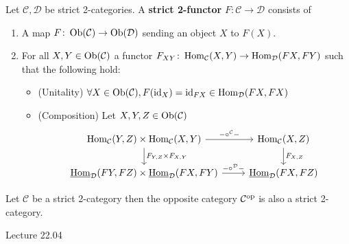 \begin{defi}
\label{strict_twofun_defi}
	Let $ \mathcal{ C } , \mathcal{ D } $  be strict 2-categories.
	A \textbf{strict 2-functor} $ F \colon \mathcal{ C } \to \mathcal{ D } $ consists of 
	\begin{enumerate}
		\item 
		A map $ F \colon \operatorname{Ob} ( \mathcal{ C } ) \to \operatorname{Ob} ( \mathcal{ D } )$  sending an object $ X $ to $ F ( X ) $.
		
		\item 
		For all $ X , Y \in \operatorname{Ob} ( \mathcal{ C } ) $ a functor $ F_{ X Y } \colon \operatorname{Hom}_{ \mathcal{ C } } ( X , Y ) \to \operatorname{Hom}_{ \mathcal{ D } } ( F X , F Y ) $ such that the following hold:
		\begin{itemize}
			\item 
			(Unitality)
			$ \forall X \in \operatorname{Ob} ( \mathcal{ C } ) , F ( \operatorname{id}_X ) = \operatorname{id}_{ F X } \in \operatorname{Hom}_{ \mathcal{ D } } ( F X, F X )$
				
			\item 
			(Composition)
			Let $ X, Y , Z \in \operatorname{Ob} ( \mathcal{ C } ) $
			\[
			\begin{tikzcd}
				\Hom_{ \mathcal{ C } } ( Y, Z ) \times \Hom_{ \mathcal{ C } }( X , Y )
				\ar[r, " - \circ^{ \mathcal{ C } } - "]
				\ar[d, " F_{ Y , Z } \times F_{ X , Y } "]
				&
				\Hom_{ \mathcal{ C } } ( X , Z )
				\ar[d, " F_{ X , Z } "]
				\\
				\twoHom_{ \mathcal{ D } } ( F Y , F Z ) \times \twoHom_{ \mathcal{ D } } ( F X , F Y )
				\ar[r, " - \circ^{ \mathcal{ D } } -"]
				&
				\twoHom_{ \mathcal{ D } }  ( F X , F Z )
			\end{tikzcd}
			\]
		\end{itemize}
	\end{enumerate}
	Let $ \mathcal{ C } $ be a strict 2-category then the opposite category $ \mathcal{ C }^{ \operatorname{op} } $ is also a strict 2-category.
\end{defi}

Lecture 22.04

